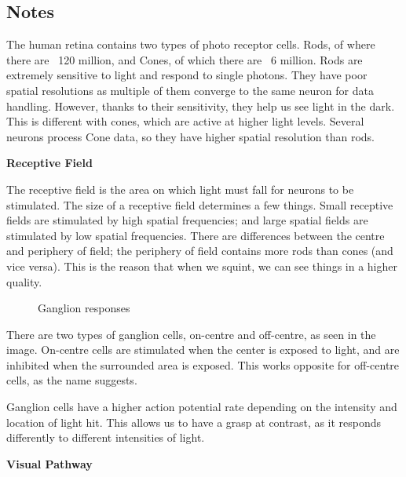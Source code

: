 \subsection{Notes}
The human retina contains two types of photo receptor cells. Rods, of where there are ~120 million, and Cones, of which there are ~6 million. Rods are extremely sensitive to light and respond to single photons. They have poor spatial resolutions as multiple of them converge to the same neuron for data handling. However, thanks to their sensitivity, they help us see light in the dark.
This is different with cones, which are active at higher light levels. Several neurons process Cone data, so they have higher spatial resolution than rods.

\textbf{Receptive Field}

The receptive field is the area on which light must fall for neurons to be stimulated. The size of a receptive field determines a few things. Small receptive fields are stimulated by high spatial frequencies; and large spatial fields are stimulated by low spatial frequencies. There are differences between the centre and periphery of field; the periphery of field contains more rods than cones (and vice versa). This is the reason that when we squint, we can see things in a higher quality.
\begin{figure}[!htb]
	\caption{\label{fig:lens} Ganglion responses}
\end{figure}
There are two types of ganglion cells, on-centre and off-centre, as seen in the image. On-centre cells are stimulated when the center is exposed to light, and are inhibited when the surrounded area is exposed. This works opposite for off-centre cells, as the name suggests.

Ganglion cells have a higher action potential rate depending on the intensity and location of light hit. This allows us to have a grasp at contrast, as it responds differently to different intensities of light.

\textbf{Visual Pathway}

